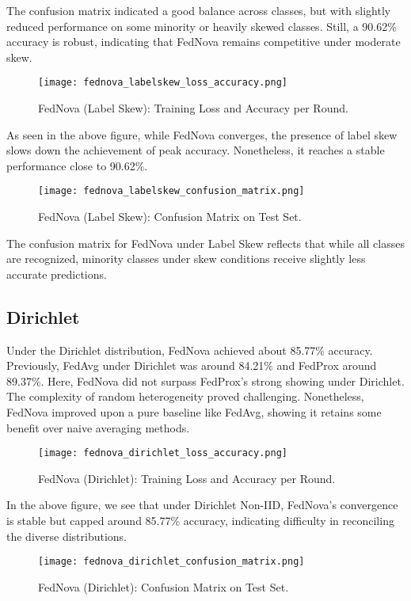 \documentclass[12pt,a4paper]{report}
\begin{document}
The confusion matrix indicated a good balance across classes, but with slightly reduced performance on some minority or heavily skewed classes. Still, a 90.62\% accuracy is robust, indicating that FedNova remains competitive under moderate skew.

\begin{figure}[H]
	\centering
	\texttt{[image: fednova\_labelskew\_loss\_accuracy.png]}
	\caption{FedNova (Label Skew): Training Loss and Accuracy per Round.}
\end{figure}

As seen in the above figure, while FedNova converges, the presence of label skew slows down the achievement of peak accuracy. Nonetheless, it reaches a stable performance close to 90.62\%.

\begin{figure}[H]
	\centering
	\texttt{[image: fednova\_labelskew\_confusion\_matrix.png]}
	\caption{FedNova (Label Skew): Confusion Matrix on Test Set.}
\end{figure}

The confusion matrix for FedNova under Label Skew reflects that while all classes are recognized, minority classes under skew conditions receive slightly less accurate predictions.

\subsection{Dirichlet}
Under the Dirichlet distribution, FedNova achieved about 85.77\% accuracy. Previously, FedAvg under Dirichlet was around 84.21\% and FedProx around 89.37\%. Here, FedNova did not surpass FedProx’s strong showing under Dirichlet. The complexity of random heterogeneity proved challenging. Nonetheless, FedNova improved upon a pure baseline like FedAvg, showing it retains some benefit over naive averaging methods.

\begin{figure}[H]
	\centering
	\texttt{[image: fednova\_dirichlet\_loss\_accuracy.png]}
	\caption{FedNova (Dirichlet): Training Loss and Accuracy per Round.}
\end{figure}

In the above figure, we see that under Dirichlet Non-IID, FedNova's convergence is stable but capped around 85.77\% accuracy, indicating difficulty in reconciling the diverse distributions.

\begin{figure}[H]
	\centering
	\texttt{[image: fednova\_dirichlet\_confusion\_matrix.png]}
	\caption{FedNova (Dirichlet): Confusion Matrix on Test Set.}
\end{figure}
\end{document}
